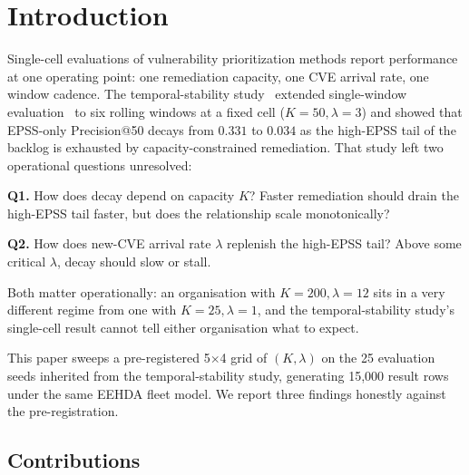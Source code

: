 \section{Introduction}

Single-cell evaluations of vulnerability prioritization methods report
performance at one operating point: one remediation capacity, one CVE
arrival rate, one window cadence. The temporal-stability study~\cite{paper5temporal} extended
single-window evaluation~\cite{paper4hygieneprio} to six rolling windows
at a fixed cell ($K = 50, \lambda = 3$) and showed that EPSS-only
Precision@50 decays from $0.331$ to $0.034$ as the high-EPSS tail of
the backlog is exhausted by capacity-constrained remediation. That study
left two operational questions unresolved:

\textbf{Q1.} How does decay depend on capacity $K$? Faster remediation
should drain the high-EPSS tail faster, but does the relationship
scale monotonically?

\textbf{Q2.} How does new-CVE arrival rate $\lambda$ replenish the high-EPSS
tail? Above some critical $\lambda$, decay should slow or stall.

Both matter operationally: an organisation with $K = 200, \lambda = 12$
sits in a very different regime from one with $K = 25, \lambda = 1$, and
the temporal-stability study's single-cell result cannot tell either organisation what to expect.

This paper sweeps a pre-registered 5$\times$4 grid of $(K, \lambda)$
on the 25 evaluation seeds inherited from the temporal-stability study, generating 15{,}000
result rows under the same EEHDA fleet model. We report three
findings honestly against the pre-registration.

\subsection{Contributions}

